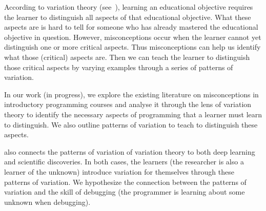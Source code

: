 According to variation theory (see~\cite{NCOL}), learning an 
educational objective requires the learner to distinguish all aspects of that 
educational objective. What these aspects are is hard to tell for someone who 
has already mastered the educational objective in question. However, 
misconceptions occur when the learner cannot yet distinguish one or more 
critical aspects. Thus misconceptions can help us identify what those 
(critical) aspects are. Then we can teach the learner to distinguish those 
critical aspects by varying examples through a series of patterns of variation.

In our work (in progress), we explore the existing literature on misconceptions 
in introductory programming courses and analyse it through the lens of 
variation theory to identify the necessary aspects of programming that a 
learner must learn to distinguish. We also outline patterns of variation to 
teach to distinguish these aspects.

\Textcite{NCOL} also connects the patterns of variation of variation theory to 
both deep learning and scientific discoveries. In both cases, the learners (the 
researcher is also a learner of the unknown) introduce variation for themselves 
through these patterns of variation. We hypothesize the connection between the 
patterns of variation and the skill of debugging (the programmer is learning 
about some unknown when debugging).
